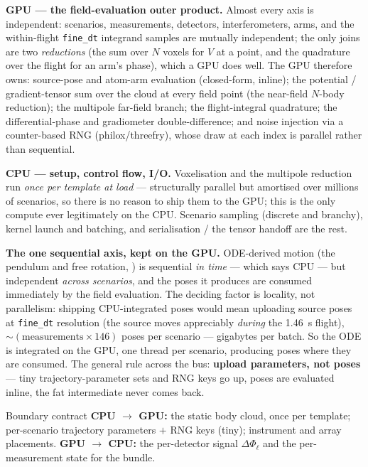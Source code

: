 \documentclass[11pt,a4paper]{article}
\theoremstyle{reqstyle}
\begin{document}
\textbf{GPU --- the field-evaluation outer product.} Almost every axis is independent:
scenarios, measurements, detectors, interferometers, arms, and the within-flight
\texttt{fine\_dt} integrand samples are mutually independent; the only joins are two
\emph{reductions} (the sum over $N$ voxels for $V$ at a point, and the quadrature over the
flight for an arm's phase), which a GPU does well. The GPU therefore owns: source-pose and
atom-arm evaluation (closed-form, inline); the potential / gradient-tensor sum over the cloud
at every field point (the near-field $N$-body reduction); the multipole far-field branch; the
flight-integral quadrature; the differential-phase and gradiometer double-difference; and
noise injection via a counter-based RNG (philox/threefry), whose draw at each index is
parallel rather than sequential.

\textbf{CPU --- setup, control flow, I/O.} Voxelisation and the multipole reduction run
\emph{once per template at load} --- structurally parallel but amortised over millions of
scenarios, so there is no reason to ship them to the GPU; this is the only compute ever
legitimately on the CPU. Scenario sampling (discrete and branchy), kernel launch and
batching, and serialisation / the tensor handoff are the rest.

\textbf{The one sequential axis, kept on the GPU.} ODE-derived motion (the pendulum and free
rotation, ) is sequential \emph{in time} --- which says CPU --- but independent
\emph{across scenarios}, and the poses it produces are consumed immediately by the field
evaluation. The deciding factor is locality, not parallelism: shipping CPU-integrated poses
would mean uploading source poses at \texttt{fine\_dt} resolution (the source moves
appreciably \emph{during} the \SI{1.46}{\second} flight), $\sim(\text{measurements}\times 146)$
poses per scenario --- gigabytes per batch. So the ODE is integrated on the GPU, one thread
per scenario, producing poses where they are consumed. The general rule across the bus:
\textbf{upload parameters, not poses} --- tiny trajectory-parameter sets and RNG keys go up,
poses are evaluated inline, the fat intermediate never comes back.

\begin{seambox}{Boundary contract}
\textbf{CPU $\to$ GPU:} the static body cloud, once per template; per-scenario trajectory
parameters $+$ RNG keys (tiny); instrument and array placements.\quad
\textbf{GPU $\to$ CPU:} the per-detector signal $\Delta\Phi_\ell$ and the per-measurement
state for the bundle.
\end{seambox}
\end{document}
